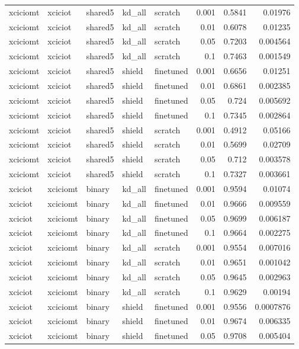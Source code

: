 \begin{table}
\begin{tabular}{lllllrrr}
xciciomt & xciciot & shared5 & kd_all & scratch & 0.001 & 0.5841 & 0.01976 \\
xciciomt & xciciot & shared5 & kd_all & scratch & 0.01 & 0.6078 & 0.01235 \\
xciciomt & xciciot & shared5 & kd_all & scratch & 0.05 & 0.7203 & 0.004564 \\
xciciomt & xciciot & shared5 & kd_all & scratch & 0.1 & 0.7463 & 0.001549 \\
xciciomt & xciciot & shared5 & shield & finetuned & 0.001 & 0.6656 & 0.01251 \\
xciciomt & xciciot & shared5 & shield & finetuned & 0.01 & 0.6861 & 0.002385 \\
xciciomt & xciciot & shared5 & shield & finetuned & 0.05 & 0.724 & 0.005692 \\
xciciomt & xciciot & shared5 & shield & finetuned & 0.1 & 0.7345 & 0.002864 \\
xciciomt & xciciot & shared5 & shield & scratch & 0.001 & 0.4912 & 0.05166 \\
xciciomt & xciciot & shared5 & shield & scratch & 0.01 & 0.5699 & 0.02709 \\
xciciomt & xciciot & shared5 & shield & scratch & 0.05 & 0.712 & 0.003578 \\
xciciomt & xciciot & shared5 & shield & scratch & 0.1 & 0.7327 & 0.003661 \\
xciciot & xciciomt & binary & kd_all & finetuned & 0.001 & 0.9594 & 0.01074 \\
xciciot & xciciomt & binary & kd_all & finetuned & 0.01 & 0.9666 & 0.009559 \\
xciciot & xciciomt & binary & kd_all & finetuned & 0.05 & 0.9699 & 0.006187 \\
xciciot & xciciomt & binary & kd_all & finetuned & 0.1 & 0.9664 & 0.002275 \\
xciciot & xciciomt & binary & kd_all & scratch & 0.001 & 0.9554 & 0.007016 \\
xciciot & xciciomt & binary & kd_all & scratch & 0.01 & 0.9651 & 0.001042 \\
xciciot & xciciomt & binary & kd_all & scratch & 0.05 & 0.9645 & 0.002963 \\
xciciot & xciciomt & binary & kd_all & scratch & 0.1 & 0.9629 & 0.00194 \\
xciciot & xciciomt & binary & shield & finetuned & 0.001 & 0.9556 & 0.0007876 \\
xciciot & xciciomt & binary & shield & finetuned & 0.01 & 0.9674 & 0.006335 \\
xciciot & xciciomt & binary & shield & finetuned & 0.05 & 0.9708 & 0.005404 \\

\end{tabular}
\end{table}
